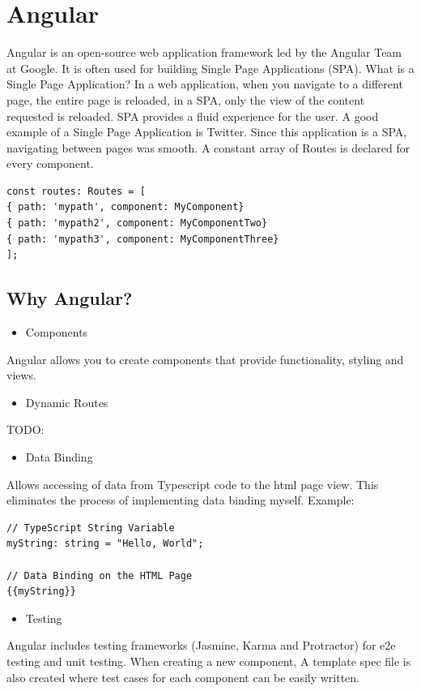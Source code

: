 \section{Angular}
Angular is an open-source web application framework led by the Angular Team at Google. It is often used for building Single Page Applications (SPA). What is a Single Page Application? In a web application, when you navigate to a different page, the entire page is reloaded, in a SPA, only the view of the content requested is reloaded. SPA provides a fluid experience for the user. A good example of a Single Page Application is Twitter. Since this application is a SPA, navigating between pages was smooth. A constant array of Routes is declared for every component.
\begin{verbatim}
const routes: Routes = [
{ path: 'mypath', component: MyComponent}
{ path: 'mypath2', component: MyComponentTwo}
{ path: 'mypath3', component: MyComponentThree}
];
\end{verbatim}

\newpage
\subsection{Why Angular?}

\begin{itemize}
	\item Components
\end{itemize}
Angular allows you to create components that provide functionality, styling and views.

\begin{itemize}
	\item Dynamic Routes
\end{itemize}
TODO:

\begin{itemize}
	\item Data Binding
\end{itemize}
Allows accessing of data from Typescript code to the html page view. This eliminates the process of implementing data binding myself.
Example:
\begin{verbatim}
// TypeScript String Variable
myString: string = "Hello, World";

// Data Binding on the HTML Page
{{myString}}
\end{verbatim}

\begin{itemize}
	\item Testing
\end{itemize}
Angular includes testing frameworks (Jasmine, Karma and Protractor) for e2e testing and unit testing. When creating a new component, A template spec file is also created where test cases for each component can be easily written.

